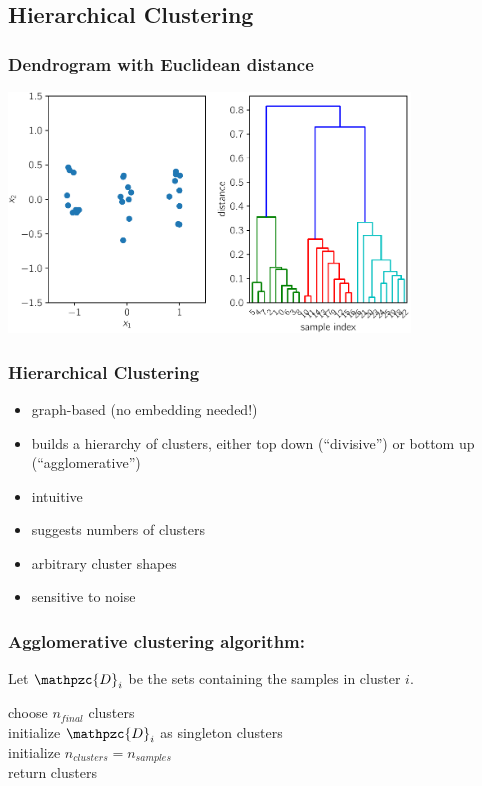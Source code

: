 \documentclass[Nike]{tuberlinbeamer}
\begin{document}
\subsection{Hierarchical Clustering}
\begin{frame}
  \frametitle{Dendrogram with Euclidean distance}
  \begin{center}
    \centering\includegraphics[width=0.8\textwidth]{dendrogram_euclidean.pdf}
  \end{center}
\end{frame}

\begin{frame}
  \frametitle{Hierarchical Clustering}
  \begin{itemize}[<+->]
    \item graph-based (no embedding needed!)
    \item builds a hierarchy of clusters, either top down (``divisive'') or bottom up (``agglomerative'')
    \item intuitive
    \item suggests numbers of clusters
    \item arbitrary cluster shapes
    \item sensitive to noise
  \end{itemize}
\end{frame}

\begin{frame}
  \frametitle{Agglomerative clustering algorithm:}
  Let $\mathpzc{D}_i$ be the sets containing the samples in cluster $i$.  \\
  \bigskip

  choose $n_{final}$ clusters\\
  initialize $\mathpzc{D}_i$ as singleton clusters\\
  initialize $n_{clusters} = n_{samples}$\\
  return clusters
\end{frame}
\end{document}
